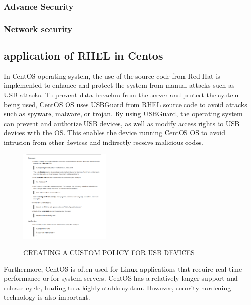 \documentclass[10pt]{article}
\begin{document}
\subsubsection{Advance Security}

\subsubsection{Network security}

\subsection{application of RHEL in Centos}

In CentOS operating system, the use of the source code from Red Hat is implemented to enhance and protect the system from manual attacks such as USB attacks. To prevent data breaches from the server and protect the system being used, CentOS OS uses USBGuard from RHEL source code to avoid attacks such as spyware, malware, or trojan. By using USBGuard, the operating system can prevent and authorize USB devices, as well as modify access rights to USB devices with the OS. This enables the device running CentOS OS to avoid intrusion from other devices and indirectly receive malicious codes.
\cite{RHEL9Sh}

\begin{figure}[!htbp]
        \centering
        \includegraphics[width=0.4\textwidth]{./research_example/Screenshot 2023-04-21 163515.png}
        \begin{description}
            \item[] 
        \end{description}
        \caption{CREATING A CUSTOM POLICY FOR USB DEVICES}
        \label{fig:description}
    \end{figure}

Furthermore, CentOS is often used for Linux applications that require real-time performance or for system servers. CentOS has a relatively longer support and release cycle, leading to a highly stable system. However, security hardening technology is also important.
\end{document}
